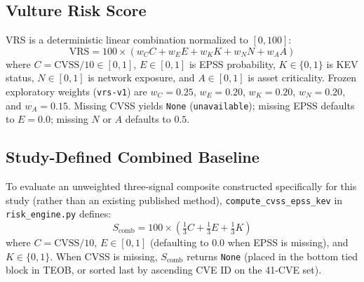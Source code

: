 \documentclass[conference]{IEEEtran}
\begin{document}
\subsection{Vulture Risk Score}
VRS is a deterministic linear combination normalized to $[0, 100]$:
\begin{equation}
\text{VRS} = 100 \times \left( w_C C + w_E E + w_K K + w_N N + w_A A \right)
\label{eq:vrs}
\end{equation}
where $C = \text{CVSS}/10 \in [0,1]$, $E \in [0,1]$ is EPSS probability, $K \in \{0,1\}$ is KEV status, $N \in [0,1]$ is network exposure, and $A \in [0,1]$ is asset criticality. Frozen exploratory weights (\texttt{vrs-v1}) are $w_C=0.25$, $w_E=0.20$, $w_K=0.20$, $w_N=0.20$, and $w_A=0.15$. Missing CVSS yields \texttt{None} (\texttt{unavailable}); missing EPSS defaults to $E=0.0$; missing $N$ or $A$ defaults to $0.5$.

\subsection{Study-Defined Combined Baseline}
To evaluate an unweighted three-signal composite constructed specifically for this study (rather than an existing published method), \texttt{compute\_cvss\_epss\_kev} in \texttt{risk\_engine.py} defines:
\begin{equation}
S_{\text{comb}} = 100 \times \left(\tfrac{1}{3} C + \tfrac{1}{3} E + \tfrac{1}{3} K\right)
\label{eq:comb}
\end{equation}
where $C = \text{CVSS}/10$, $E \in [0,1]$ (defaulting to $0.0$ when EPSS is missing), and $K \in \{0,1\}$. When CVSS is missing, $S_{\text{comb}}$ returns \texttt{None} (placed in the bottom tied block in TEOB, or sorted last by ascending CVE ID on the 41-CVE set).
\end{document}
